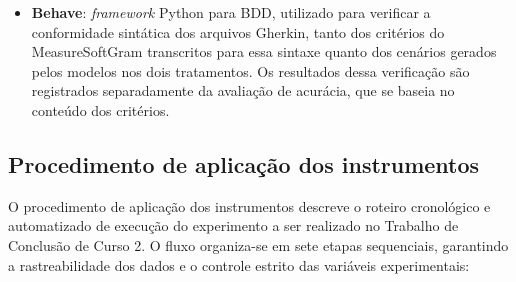 \begin{itemize}
    \item \textbf{Behave}: \textit{framework} Python para BDD, utilizado para verificar a conformidade sintática dos arquivos Gherkin, tanto dos critérios do MeasureSoftGram transcritos para essa sintaxe quanto dos cenários gerados pelos modelos nos dois tratamentos. Os resultados dessa verificação são registrados separadamente da avaliação de acurácia, que se baseia no conteúdo dos critérios.
\end{itemize}

\subsection{Procedimento de aplicação dos instrumentos}

O procedimento de aplicação dos instrumentos descreve o roteiro cronológico e automatizado de execução do experimento a ser realizado no Trabalho de Conclusão de Curso 2. O fluxo organiza-se em sete etapas sequenciais, garantindo a rastreabilidade dos dados e o controle estrito das variáveis experimentais:

